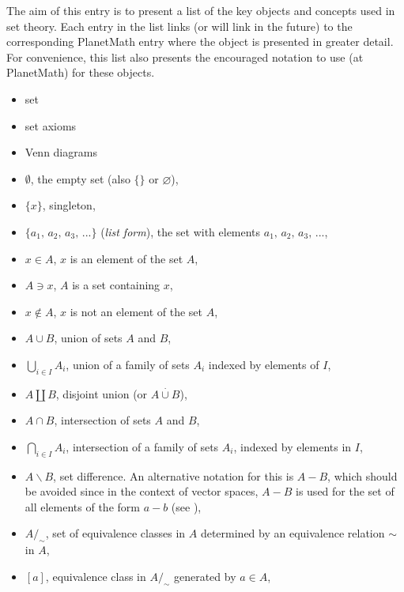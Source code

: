 \documentclass[12pt]{article}
\begin{document}
The aim of this entry is to present a list of the key objects and 
concepts used in set theory. Each entry in the list links 
(or will link in the future) to the corresponding PlanetMath 
entry where the object is presented in greater detail. 
For convenience, this list also presents the encouraged 
notation to use (at PlanetMath) for these objects.


\begin{itemize}
\item set
\item set axioms
\item Venn diagrams
\item $\emptyset$, the empty set (also $\{\}$ or $\varnothing$),
\item $\{x\}$, singleton,
\item $\{a_1,\,a_2,\,a_3,\,...\}$ ({\em list form}), the set with elements 
$a_1,\,a_2,\,a_3,\,...$,
\item $x \in A$, $x$ is an element of the set $A$,
\item $A\ni x$, $A$ is a set containing $x$,
\item $x \notin A$, $x$ is not an element of the set $A$,
\item $A\cup B$, union of sets $A$ and $B$,
\item $\bigcup_{i\in I} A_i$, union of a family of sets $A_i$ indexed by elements of $I$,
\item $A\coprod B$, disjoint union (or $A\overset{\cdot}{\cup} B$),
\item $A\cap B$, intersection of sets $A$ and $B$,
\item $\bigcap_{i\in I} A_i$, intersection of a family of sets $A_i$, indexed by elements  in $I$,
\item $A\!\smallsetminus\!B$, set difference. An alternative notation for this is $A-B$, which  should be avoided since in the context of vector spaces, $A-B$ is 
used for the set of all elements of the form $a-b$ (see ),
\item $A/_\sim$, set of equivalence classes in $A$ determined by an equivalence 
relation $\sim$ in $A$, 
\item $[a]$, equivalence class in $A/_\sim$ generated by $a\in A$,

\end{itemize}
\end{document}
